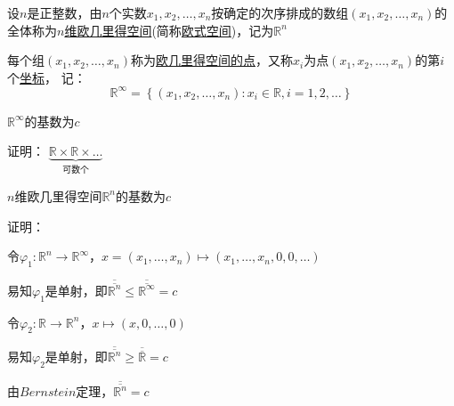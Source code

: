 \begin{td}
设$n$是正整数，由$n$个实数$x_{1},x_{2},\dots,x_{n} $按确定的次序排成的数组$\left(x_{1},x_{2},\dots,x_{n}\right) $的全体称为\uline{$n$维欧几里得空间}(简称\uline{欧式空间})，记为$\mathbb{R}^{n}$
\par \quad 每个组$\left(x_{1},x_{2},\dots,x_{n}\right) $称为\uline{欧几里得空间的点}，又称$x_{i}$为点$\left(x_{1},x_{2},\dots,x_{n}\right) $的第$i$个\uline{坐标}，
记：
$$\mathbb{R}^{\infty} = \left\{\left(x_{1},x_{2},\dots,x_{n}\right) : x_{i} \in \mathbb{R} , i = 1,2,\dots\right\} $$    
\end{td}

\begin{la}
$\mathbb{R}^{\infty}$的基数为$c$    
\end{la}
\noindent 证明： $\underbrace{\mathbb{R} \times \mathbb{R} \times \dots}_\text{可数个}$

\begin{td}
$n$维欧几里得空间$\mathbb{R}^{n}$的基数为$c$    
\end{td}
\noindent 证明：
\par {}令$\varphi _{1} : \mathbb{R}^{n} \to \mathbb{R}^{\infty}$，$x = \left(x_{1},\dots,x_{n} \right) \mapsto \left(x_{1},\dots,x_{n},0,0,\dots\right)  $
\par \quad 易知$\varphi_{1} $是单射，即$\overline{\overline{\mathbb{R}^{n}}} \leqslant \overline{\overline{\mathbb{R}^{\infty}}} = c$
\par {}令$\varphi _{2} : \mathbb{R} \to \mathbb{R}^{n}$，$x \mapsto \left(x,0,\dots,0\right)  $
\par \quad 易知$\varphi_{2} $是单射，即$\overline{\overline{\mathbb{R}^{n}}} \geqslant  \overline{\overline{\mathbb{R}}} = c$
\par 由$Bernstein$定理，$\overline{\overline{\mathbb{R}^{n}}} = c$

